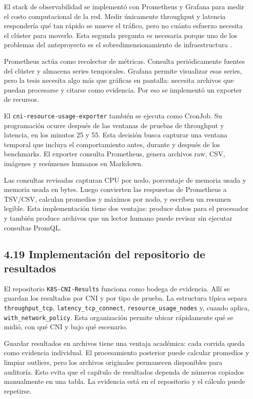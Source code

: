 El stack de observabilidad se implementó con Prometheus y Grafana para medir el costo computacional de la red. Medir únicamente throughput y latencia respondería qué tan rápido se mueve el tráfico, pero no cuánto esfuerzo necesita el clúster para moverlo. Esta segunda pregunta es necesaria porque uno de los problemas del anteproyecto es el sobredimensionamiento de infraestructura \cite{ref29}.

Prometheus actúa como recolector de métricas. Consulta periódicamente fuentes del clúster y almacena series temporales. Grafana permite visualizar esas series, pero la tesis necesita algo más que gráficas en pantalla: necesita archivos que puedan procesarse y citarse como evidencia. Por eso se implementó un exporter de recursos.

El \texttt{cni-resource-usage-exporter} también se ejecuta como CronJob. Su programación ocurre después de las ventanas de pruebas de throughput y latencia, en los minutos 25 y 55. Esta decisión busca capturar una ventana temporal que incluya el comportamiento antes, durante y después de los benchmarks. El exporter consulta Prometheus, genera archivos raw, CSV, imágenes y resúmenes humanos en Markdown.

Las consultas revisadas capturan CPU por nodo, porcentaje de memoria usada y memoria usada en bytes. Luego convierten las respuestas de Prometheus a TSV/CSV, calculan promedios y máximos por nodo, y escriben un resumen legible. Esta implementación tiene dos ventajas: produce datos para el procesador y también produce archivos que un lector humano puede revisar sin ejecutar consultas PromQL.

\subsection{4.19 Implementación del repositorio de resultados}

El repositorio \texttt{K8S-CNI-Results} funciona como bodega de evidencia. Allí se guardan los resultados por CNI y por tipo de prueba. La estructura típica separa \texttt{throughput\_tcp}, \texttt{latency\_tcp\_connect}, \texttt{resource\_usage\_nodes} y, cuando aplica, \texttt{with\_network\_policy}. Esta organización permite ubicar rápidamente qué se midió, con qué CNI y bajo qué escenario.

Guardar resultados en archivos tiene una ventaja académica: cada corrida queda como evidencia individual. El procesamiento posterior puede calcular promedios y limpiar outliers, pero los archivos originales permanecen disponibles para auditoría. Esto evita que el capítulo de resultados dependa de números copiados manualmente en una tabla. La evidencia está en el repositorio y el cálculo puede repetirse.

